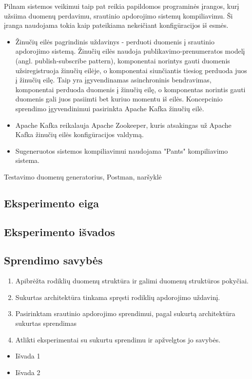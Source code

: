 \documentclass{VUMIFPSbakalaurinis}
\begin{document}
Pilnam sistemos veikimui taip pat reikia papildomos programinės įrangos, kurį užsiima duomenų perdavimu, srautinio apdorojimo sistemų kompiliavimu. Ši įranga naudojama tokia kaip pateikiama nekeičiant konfigūracijos iš esmės.
\begin{itemize}
    \item Žinučių eilės pagrindinis uždavinys - perduoti duomenis į srautinio apdorojimo sistemą. Žinučių eilės naudoja publikavimo-prenumeratos modelį (angl. publish-subscribe pattern), komponentai norintys gauti duomenis užsiregistruoja žinučių eilėje, o komponentai siunčiantis tiesiog perduoda juos į žinučių eilę. Taip yra įgyvendinamas asinchroninis bendravimas, komponentai perduoda duomenis į žinučių eilę, o komponentas norintis gauti duomenis gali juos pasiimti bet kuriuo momentu iš eilės. Koncepcinio sprendimo įgyvendinimui pasirinkta Apache Kafka žinučių eilė.
    \item Apache Kafka reikalauja Apache Zookeeper, kuris atsakingas už Apache Kafka žinučių eilės konfigūracijos valdymą.
    \item Sugeneruotos sistemos kompiliavimui naudojama "Pants" kompiliavimo sistema.
\end{itemize}

Testavimo duomenų generatorius, Postman, naršyklė

\subsection{Eksperimento eiga}

\subsection{Eksperimento išvados}

\subsection{Sprendimo savybės}


\begin{enumerate}
    \item Apibrėžta rodiklių duomenų struktūra ir galimi duomenų struktūros pokyčiai.
    \item Sukurtas architektūra tinkama spręsti rodiklių apdorojimo uždavinį. 
    \item Pasirinktam srautinio apdorojimo sprendimui, pagal sukurtą architektūra sukurtas sprendimas
    \item Atlikti eksperimentai su sukurtu sprendimu ir apžvelgtos jo savybės. 
\end{enumerate}

\begin{itemize}
    \item Išvada 1
    \item Išvada 2 
\end{itemize}

\printbibliography[heading=bibintoc] 


\end{document}
